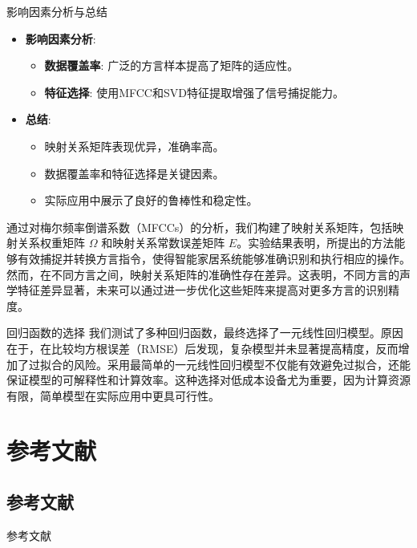 \documentclass[10pt]{beamer}
\begin{document}
\begin{frame}{影响因素分析与总结}
  \begin{itemize}
    \item \textbf{影响因素分析}:
    \begin{itemize}
      \item \textbf{数据覆盖率}: 广泛的方言样本提高了矩阵的适应性。
      \item \textbf{特征选择}: 使用MFCC和SVD特征提取增强了信号捕捉能力。
    \end{itemize}
    
    \vspace{0.5cm}
    
    \item \textbf{总结}:
    \begin{itemize}
      \item 映射关系矩阵表现优异，准确率高。
      \item 数据覆盖率和特征选择是关键因素。
      \item 实际应用中展示了良好的鲁棒性和稳定性。
    \end{itemize}
  \end{itemize}
\end{frame}
\begin{frame}
    通过对梅尔频率倒谱系数（MFCCs）的分析，我们构建了映射关系矩阵，包括映射关系权重矩阵 \( \Omega \) 和映射关系常数误差矩阵 \( E \)。实验结果表明，所提出的方法能够有效捕捉并转换方言指令，使得智能家居系统能够准确识别和执行相应的操作。然而，在不同方言之间，映射关系矩阵的准确性存在差异。这表明，不同方言的声学特征差异显著，未来可以通过进一步优化这些矩阵来提高对更多方言的识别精度。
\end{frame}
\begin{frame}{回归函数的选择}
    我们测试了多种回归函数，最终选择了一元线性回归模型。原因在于，在比较均方根误差（RMSE）后发现，复杂模型并未显著提高精度，反而增加了过拟合的风险。采用最简单的一元线性回归模型不仅能有效避免过拟合，还能保证模型的可解释性和计算效率。这种选择对低成本设备尤为重要，因为计算资源有限，简单模型在实际应用中更具可行性。
\end{frame}
\section{参考文献}
\subsection{参考文献}
\begin{frame}{参考文献}
    
\end{frame}
\end{document}
